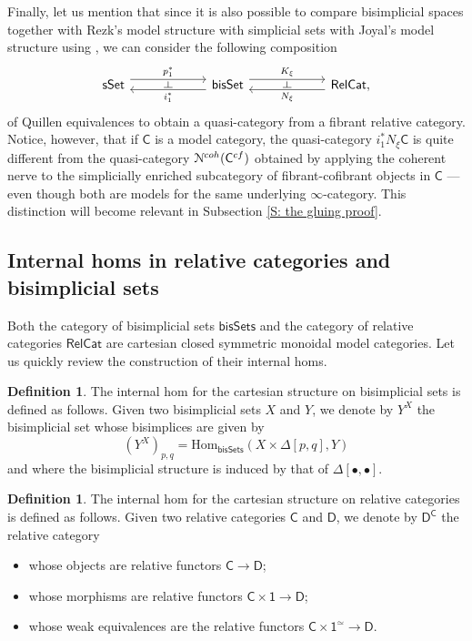 \documentclass[a4paper,12pt]{amsart}
\renewcommand{\mathcal}{\EuScript}
\theoremstyle{plain}
\theoremstyle{definition}
\newtheorem{definition}[theorem]{Definition}%
\theoremstyle{remark}
\begin{document}
Finally, let us mention that since it is also possible to compare bisimplicial spaces together with Rezk's model structure with simplicial sets with Joyal's model structure using \cite{JoaylTierney07}, we can consider the following composition
\[
\begin{tikzcd}[column sep=5pc,row sep=3pc]
		\mathsf{sSet} 	\arrow[r, shift left=1.1ex, "p_1^*"{name=A}]
         &\mathsf{bisSet} \arrow[r, shift left=1.1ex, "K_{\xi}"{name=F}] \arrow[l, shift left=.75ex, "i_1^*"{name=B}] & \mathsf{RelCat} , \arrow[l, shift left=.75ex, "N_{\xi}"{name=U}]
            \arrow[phantom, from=F, to=U, , "\dashv" rotate=-90] \arrow[phantom, from=A, to=B, , "\dashv" rotate=-90]
\end{tikzcd}
\]
of Quillen equivalences to obtain a quasi-category from a fibrant relative category. Notice, however, that if $\mathsf{C}$ is a model category, the quasi-category $i_1^* N_\xi\mathsf{C}$ is quite different from the quasi-category $\mathcal{N}^{coh}(\mathsf{C}^{cf})$ obtained by applying the coherent nerve to the simplicially enriched subcategory of fibrant-cofibrant objects in $\mathsf{C}$ --- even though both are models for the same underlying $\infty$-category. This distinction will become relevant in Subsection \ref{S: the gluing proof}. 

\subsection{Internal homs in relative categories and bisimplicial sets}\label{subsection: internal homs}
Both the category of bisimplicial sets $\mathsf{bisSets}$ and the category of relative categories $\mathsf{RelCat}$ are cartesian closed symmetric monoidal model categories. Let us  quickly review the construction of their internal homs.

\begin{definition}
The internal hom for the cartesian structure on bisimplicial sets is defined as follows. Given two bisimplicial sets $X$ and $Y$, we denote by $Y^X$ the bisimplicial set whose bisimplices are given by
\[
(Y^X)_{p,q} = \mathrm{Hom}_{\mathsf{bisSets}}(X\times\Delta[p,q],Y)
\]
and where the bisimplicial structure is induced by that of $\Delta[\bullet,\bullet]$.
    \end{definition}

\begin{definition}
    
The internal hom for the cartesian structure on relative categories is defined as follows. Given two relative categories $\mathsf{C}$ and $\mathsf{D}$, we denote by $\mathsf{D}^\mathsf{C}$ the relative category
\begin{itemize}
\item[-] whose objects are relative functors $\mathsf{C} \rightarrow \mathsf{D}$;
\item[-] whose morphisms are relative functors $\mathsf{C}\times\mathsf{1}\rightarrow \mathsf{D}$;
\item[-] whose weak equivalences are the relative functors $\mathsf{C}\times\mathsf{1}^{\simeq}\rightarrow \mathsf{D}$.
\end{itemize}
\end{definition}
\end{document}
